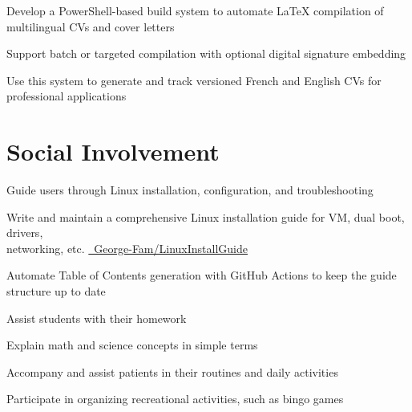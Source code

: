 \documentclass[letterpaper,10pt]{article}
\begin{document}
  \begin{resume_list}
  \item Develop a PowerShell-based build system to automate LaTeX compilation of multilingual CVs and cover letters 
  \item Support batch or targeted compilation with optional digital signature embedding
  \item Use this system to generate and track versioned French and English CVs for professional applications
  \end{resume_list}
  

  \section{Social Involvement}
  \begin{resume_list}
    \item Guide users through Linux installation, configuration, and troubleshooting
    \item Write and maintain a comprehensive Linux installation guide for VM, dual boot, drivers,\\ networking, etc. {\small \href{https://github.com/George-Fam/LinuxInstallGuide}{\faGithubSquare\ George-Fam/LinuxInstallGuide}}
    \item Automate Table of Contents generation with GitHub Actions to keep the guide structure up to date
  \end{resume_list}

  \begin{resume_list}
    \item Assist students with their homework
    \item Explain math and science concepts in simple terms
  \end{resume_list}
  
\begin{resume_list}
    \item Accompany and assist patients in their routines and daily activities
    \item Participate in organizing recreational activities, such as bingo games
\end{resume_list}
\end{document}
